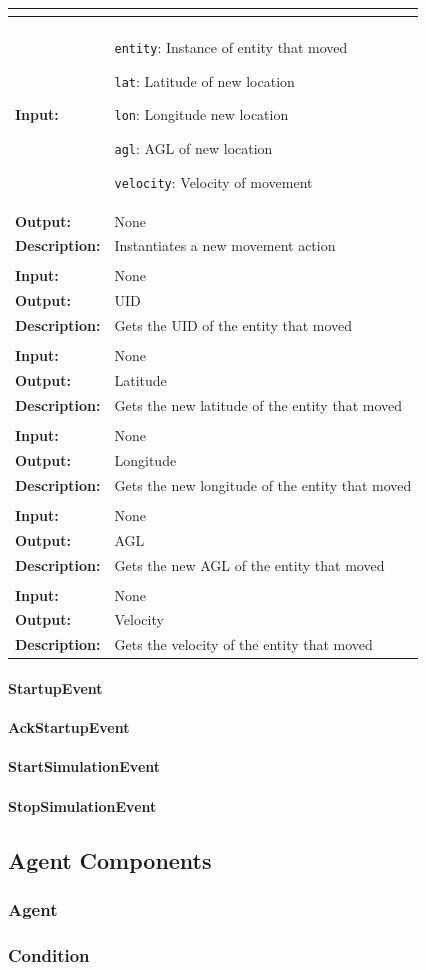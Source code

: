 \documentclass[titlepage]{article}
\renewenvironment{itemize*}%
    {\begin{itemize}%
        \setlength{\itemsep}{0pt}%
        \setlength{\parskip}{0pt}%
        \setlength{\partopsep}{0pt}%
        \setlength{\topsep}{0pt}}%
    {\end{itemize}}
\newcommand{\operations}[1]{
\begin{center}
    \begin{tabular}{|p{3cm}|p{9cm + 2.0\tabcolsep}|}
    \hline
    \multicolumn{2}{|l|}{\cellcolor[gray]{0.5}{\textbf{Operations}}} \\ \hline
#1
    \end{tabular}
\end{center}
}
\newcommand{\operation}[4]{
    \hline
    \multicolumn{2}{|l|}{\cellcolor[gray]{0.8}{\texttt{#1}}} \\ \hline
    \hspace{7pt}\textbf{Input:} & #2 \\ \hline
    \hspace{7pt}\textbf{Output:} & #3 \\ \hline
    \hspace{7pt}\textbf{Description:} & #4 \\ \hline
}
\begin{document}
\operations
{
    \operation{\_\_init\_\_(entity, lat, lon, agl, velocity)}
    {
        \begin{itemize*}
            \item \texttt{entity}: Instance of entity that moved
            \item \texttt{lat}: Latitude of new location
            \item \texttt{lon}: Longitude new location
            \item \texttt{agl}: AGL of new location
            \item \texttt{velocity}: Velocity of movement
        \end{itemize*}
    }{None}{Instantiates a new movement action}
    \operation{get\_uid()}{None}{UID}{Gets the UID of the entity that moved}
    \operation{get\_lat()}{None}{Latitude}{Gets the new latitude of the entity that moved}
    \operation{get\_lon()}{None}{Longitude}{Gets the new longitude of the entity that moved}
    \operation{get\_agl()}{None}{AGL}{Gets the new AGL of the entity that moved}
    \operation{get\_velocity()}{None}{Velocity}{Gets the velocity of the entity that moved}
}

\paragraph{StartupEvent}
\paragraph{AckStartupEvent}
\paragraph{StartSimulationEvent}
\paragraph{StopSimulationEvent}

\subsection{Agent Components}
\subsubsection{Agent}

\subsubsection{Condition}
\end{document}
